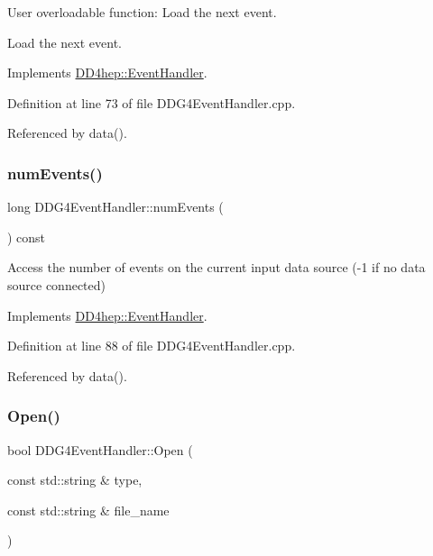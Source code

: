 User overloadable function\+: Load the next event. 

Load the next event. 

Implements \hyperlink{class_d_d4hep_1_1_event_handler_ac2360791d3a44f4cef0987f9a7ec51ce}{D\+D4hep\+::\+Event\+Handler}.



Definition at line 73 of file D\+D\+G4\+Event\+Handler.\+cpp.



Referenced by data().

\hypertarget{class_d_d4hep_1_1_d_d_g4_event_handler_af8ae7a5a68752fa17aa83ab9f0a952fe}{}\label{class_d_d4hep_1_1_d_d_g4_event_handler_af8ae7a5a68752fa17aa83ab9f0a952fe} 
\subsubsection{\texorpdfstring{num\+Events()}{numEvents()}}
{\footnotesize\ttfamily long D\+D\+G4\+Event\+Handler\+::num\+Events (\begin{DoxyParamCaption}{ }\end{DoxyParamCaption}) const\hspace{0.3cm}{\ttfamily [virtual]}}



Access the number of events on the current input data source (-\/1 if no data source connected) 



Implements \hyperlink{class_d_d4hep_1_1_event_handler_a005436bba029439b513645485e3c0ff5}{D\+D4hep\+::\+Event\+Handler}.



Definition at line 88 of file D\+D\+G4\+Event\+Handler.\+cpp.



Referenced by data().

\hypertarget{class_d_d4hep_1_1_d_d_g4_event_handler_a110e487b2813985f56058382357f0754}{}\label{class_d_d4hep_1_1_d_d_g4_event_handler_a110e487b2813985f56058382357f0754} 
\subsubsection{\texorpdfstring{Open()}{Open()}}
{\footnotesize\ttfamily bool D\+D\+G4\+Event\+Handler\+::\+Open (\begin{DoxyParamCaption}\item[{const std\+::string \&}]{type,  }\item[{const std\+::string \&}]{file\+\_\+name }\end{DoxyParamCaption})\hspace{0.3cm}{\ttfamily [virtual]}}



